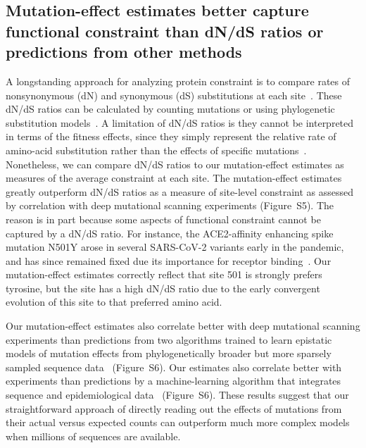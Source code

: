 \documentclass[9pt,twocolumn,twoside]{gsajnl_modified}
\begin{document}
\subsection*{Mutation-effect estimates better capture functional constraint than dN/dS ratios or predictions from other methods}
A longstanding approach for analyzing protein constraint is to compare rates of nonsynonymous (dN) and synonymous (dS) substitutions at each site~\citep{nielsen1998likelihood,kosakovsky2005not}.
These dN/dS ratios can be calculated by counting mutations or using phylogenetic substitution models~\citep{kosakovsky2005not,yang2000estimating}.
A limitation of dN/dS ratios is they cannot be interpreted in terms of the fitness effects, since they simply represent the relative rate of amino-acid substitution rather than the effects of specific mutations~\citep{spielman2015relationship,kryazhimskiy2008population}.
Nonetheless, we can compare dN/dS ratios to our mutation-effect estimates as measures of the average constraint at each site.
The mutation-effect estimates greatly outperform dN/dS ratios as a measure of site-level constraint as assessed by correlation with deep mutational scanning experiments (Figure~S5).
The reason is in part because some aspects of functional constraint cannot be captured by a dN/dS ratio.
For instance, the ACE2-affinity enhancing spike mutation N501Y arose in several SARS-CoV-2 variants early in the pandemic, and has since remained fixed due its importance for receptor binding~\citep{starr2022deep}.
Our mutation-effect estimates correctly reflect that site 501 is strongly prefers tyrosine, but the site has a high dN/dS ratio due to the early convergent evolution of this site to that preferred amino acid.

Our mutation-effect estimates also correlate better with deep mutational scanning experiments than predictions from two algorithms trained to learn epistatic models of mutation effects from phylogenetically broader but more sparsely sampled sequence data~\cite{thadani2022learning,rodriguez2022epistatic} (Figure~S6).
Our estimates also correlate better with experiments than predictions by a machine-learning algorithm that integrates sequence and epidemiological data~\cite{maher2022predicting} (Figure~S6).
These results suggest that our straightforward approach of directly reading out the effects of mutations from their actual versus expected counts can outperform much more complex models when millions of sequences are available.
\end{document}
